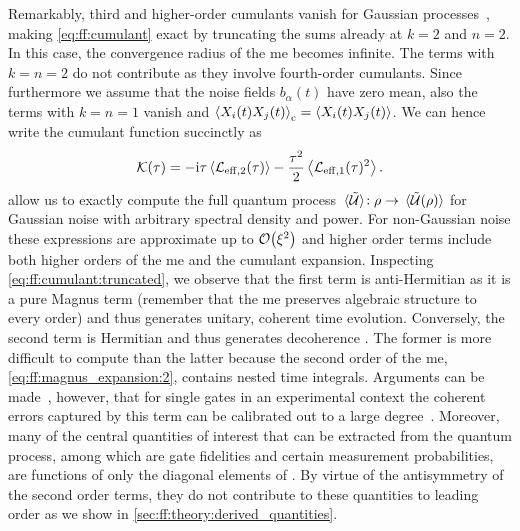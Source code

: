 Remarkably, third and higher-order cumulants vanish for Gaussian processes~\cite{Kubo1963,Szankowski2017}, making \cref{eq:ff:cumulant} exact by truncating the sums already at $k = 2$ and $n = 2$.
In this case, the convergence radius of the \gls{me} becomes infinite.
The terms with $k = n = 2$ do not contribute as they involve fourth-order cumulants.
Since furthermore we assume that the noise fields $b_\alpha(t)$ have zero mean, also the terms with $k = n = 1$ vanish and $\ev{X_i(t)X_j(t)}_\mr{c}  =  \ev{X_i(t)X_j(t)}$.
We can hence write the cumulant function succinctly as
\begin{equation}
    \cumulantfun(\tau) = - \i\tau\ev{\Li_{\mr{eff},2}(\tau)} - \frac{\tau^2}{2}\ev{\Li_{\mr{eff},1}(\tau)^2}  \label{eq:ff:cumulant:truncated}.
\end{equation}
 allow us to exactly compute the full quantum process $\ev*{\liouvUe}\!: \rho\rightarrow\ev*{\liouvUe(\rho)}$ for Gaussian noise with arbitrary spectral density and power.
For non-Gaussian noise these expressions are approximate up to $\order{\xi^2}$ and higher order terms include both higher orders of the \gls{me} and the cumulant expansion.
Inspecting \cref{eq:ff:cumulant:truncated}, we observe that the first term is anti-Hermitian as it is a pure Magnus term (remember that the \gls{me} preserves algebraic structure to every order) and thus generates unitary, coherent time evolution.
Conversely, the second term is Hermitian and thus generates decoherence .
The former is more difficult to compute than the latter because the second order of the \gls{me}, \cref{eq:ff:magnus_expansion:2}, contains nested time integrals.
Arguments can be made~\cite{Cerfontaine2021}, however, that for single gates in an experimental context the coherent errors captured by this term can be calibrated out to a large degree~\cite{Cerfontaine2020a,Kimmel2015}.
Moreover, many of the central quantities of interest that can be extracted from the quantum process, among which are gate fidelities and certain measurement probabilities, are functions of only the diagonal elements of \cumulantfun.
By virtue of the antisymmetry of the second order terms, they do not contribute to these quantities to leading order as we show in \cref{sec:ff:theory:derived_quantities}.

